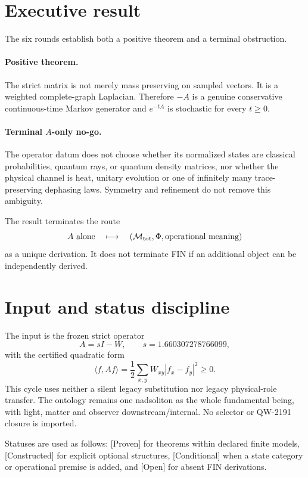 \documentclass[11pt,a4paper]{article}
\newcommand{\status}[1]{\textsf{[#1]}}
\begin{document}
\tableofcontents\newpage

\section{Executive result}

The six rounds establish both a positive theorem and a terminal obstruction.

\paragraph{Positive theorem.}
The strict matrix is not merely mass preserving on sampled vectors.  It is a
weighted complete-graph Laplacian.  Therefore $-A$ is a genuine conservative
continuous-time Markov generator and $e^{-tA}$ is stochastic for every
$t\ge0$.

\paragraph{Terminal $A$-only no-go.}
The operator datum does not choose whether its normalized states are classical
probabilities, quantum rays, or quantum density matrices, nor whether the
physical channel is heat, unitary evolution or one of infinitely many
trace-preserving dephasing laws.  Symmetry and refinement do not remove this
ambiguity.

The result terminates the route
\[
 A\ \text{alone}\quad\longmapsto\quad
 (\mathcal M_{\rm tot},\Phi,\text{operational meaning})
\]
as a unique derivation.  It does not terminate FIN if an additional object can
be independently derived.

\section{Input and status discipline}

The input is the frozen strict operator
\[
 A=sI-W,
 \qquad s=1.660307278766099,
\]
with the certified quadratic form
\[
 \langle f,Af\rangle
 =\frac12\sum_{x,y}W_{xy}|f_x-f_y|^2\ge0.
\]
This cycle uses neither a silent legacy substitution nor legacy physical-role
transfer.  The ontology remains one nadsoliton as the whole fundamental being,
with light, matter and observer downstream/internal.  No selector or
QW-2191 closure is imported.

Statuses are used as follows: \status{Proven} for theorems within declared
finite models, \status{Constructed} for explicit optional structures,
\status{Conditional} when a state category or operational premise is added,
and \status{Open} for absent FIN derivations.
\end{document}
